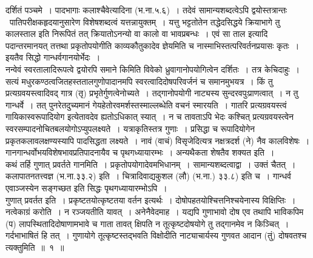 \documentclass[11pt, openany]{book}
\begin{document}
\newpage

\noindent
दर्शितं {\qtt पञ्चमे~। पादभागाः कलाश्चैवे}त्यादिना (भ.ना.५.६)~। तदेवं सामान्यशब्दत्वेऽपि द्वयोस्तत्रान्तः \textendash\ पातिपरीक्षकहृदयानुसारेण विशेषशब्दत्वं यत्तन्नायुक्तम्~। यत्तु भट्टतोतेन तद्धेदसिद्धये क्रियाभागे तु कालस्ताल इति निरूपितं तत् क्रियातोऽनन्यो वा कालो वा भावप्रबन्धः~। एवं सा ताल इत्यादि पदान्तरमानयत् तत्तथा प्रकृतोपयोगीति {\qtt काव्यकौतुकादेव} ज्ञेयमिति च नास्माभिस्तत्परिवर्तनप्रयासः कृतः~। इयतैव सिद्धो गान्धर्वगानयोर्भेदः~।\\

नन्वेवं स्वरतालादिरूपत्वे द्वयोरपि समाने किमिति विवेको ध्रुवागानोपयोगित्वेन दर्शितः~। तत्र {\qtt केचिदाहुः}~। सत्यं मधुरकण्ठत्वजितहस्ततालगुणोपादानमपि स्वरत्वादिदोषपरिवर्जनं च समानमुभयत्र~। किं  तु प्रत्यग्रवयस्त्वादिवद् गात्र (तृ) प्रभृतेर्गुणत्वेनोच्यते~। तद्गानोपयोगी नाट्यस्य सुन्दरवपुःप्राणत्वात्~। न तु गान्धर्वे~। तत् पुनरेतदुच्यमानं गेयहेतोरवमर्शस्तस्माल्लब्धेति वचनं स्मारयति~। गातरि प्रत्यग्रवयस्त्वं गायिकास्वरूपादियोग इत्येतावदेव ह्यतोऽधिकात् स्यात्~। न च तावताऽपि भेदः कश्चित् प्रत्यग्रवयस्त्वेन स्वरसम्पादनोचितबलयोगोऽप्युपलक्ष्यते~। यत्राकृतिस्तत्र गुणाः~। प्रसिद्धा च रूपादियोगेन प्रकृतकलावलक्षण्यस्यापि पादसिद्धता लक्ष्यते~। {\qtt नावं (वाचं) विसृजेदित्यत्र नक्षत्रदर्श} (ने) नैव कालविशेषः~। गानगान्धर्वोभयविशेषभावप्रतिपादनायैव च पृथगध्यायारम्भः~। अन्यथैकता शेषतैव शक्यत इति~।\\

कथं तर्हि {\qtt गुणात् प्रवर्तते गान}मिति~। प्रकृतोपयोगादेवमभिधानम्~। सामान्यशब्दत्वाद्वा~। उक्तं चैतत्~। {\qtt कलापातनतत्त्वज्ञ} (भ.ना.३३.२) इति~। {\qtt चित्रादिवाद्यकुशल} (लौ) (भ.ना.) ३३.८) इति च~। गान्धर्व एवाञ्जस्येन सङ्गच्छत इति सिद्धः पृथगध्यायारम्भोऽपि~।\\

{\qtt गुणात् प्रवर्तत} इति~। प्रकृष्टतयोत्कृष्टतया वर्तन इत्यर्थः~। दोषोपहतयोश्चित्तनिश्चयेनास्य विक्षिप्तिः~। नत्वेकाग्रं करोति~। न रञ्जयतीति यावत्~। अनेनैवेदमाह~। यद्यपि गुणाभावो दोष एव तथापि भाविकपिम (प) लापस्थितादिदोषाणामभावे च गाता तावत् क्षिपति न तूत्कृष्टदोषयोगे तु तद्गानमेव न किञ्चित्~। गर्दभाभाषितं हि तत्~। गुणायोगे तूत्कृष्टस्तद्भवति विक्षोदीति नाट्याचार्यस्य गुणवत आदान (तुं) दोषवतश्च त्यक्तुमिति~॥~१~॥

\newpage
\end{document}
